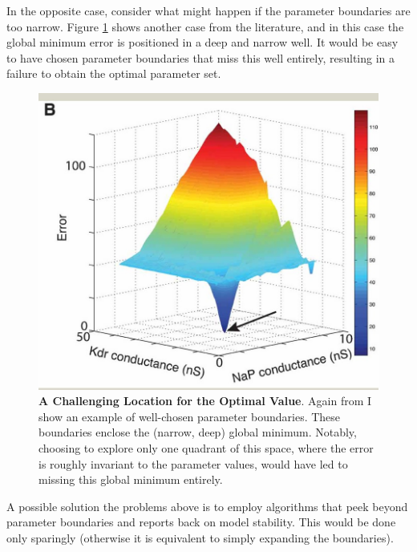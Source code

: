In the opposite case, consider what might happen if the parameter boundaries are too narrow.
Figure \ref{fig:best_at_edge_2} shows another case from the literature, and in this case the global minimum error is positioned in a deep and narrow well.
It would be easy to have chosen parameter boundaries that miss this well entirely, resulting in a failure to obtain the optimal parameter set. 

\begin{figure}
    \centering
    \includegraphics[scale=0.65]{figures/fninf-01-001-g009.jpg}
    \caption[A Challenging Location for the Optimal Value]{\textbf{A Challenging Location for the Optimal Value}.
    Again from \cite{van2008automated} I show an example of well-chosen parameter boundaries.
    These boundaries enclose the (narrow, deep) global minimum.
    Notably, choosing to explore only one quadrant of this space, where the error is roughly invariant to the parameter values, would have led to missing this global minimum entirely.}
    \label{fig:best_at_edge_2}
\end{figure}

A possible solution the problems above is to employ algorithms that peek beyond parameter boundaries and reports back on model stability.
This would be done only sparingly (otherwise it is equivalent to simply expanding the boundaries).

